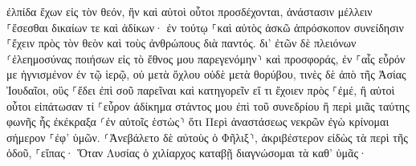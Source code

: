 \documentclass{openreader}
\begin{document}
ἐλπίδα ἔχων εἰς τὸν θεόν, ἣν καὶ αὐτοὶ οὗτοι προσδέχονται, ἀνάστασιν μέλλειν ⸀ἔσεσθαι δικαίων τε καὶ ἀδίκων· 
ἐν τούτῳ ⸀καὶ αὐτὸς ἀσκῶ ἀπρόσκοπον συνείδησιν ⸀ἔχειν πρὸς τὸν θεὸν καὶ τοὺς ἀνθρώπους διὰ παντός. 
δι’ ἐτῶν δὲ πλειόνων ⸂ἐλεημοσύνας ποιήσων εἰς τὸ ἔθνος μου παρεγενόμην⸃ καὶ προσφοράς, 
ἐν ⸀αἷς εὗρόν με ἡγνισμένον ἐν τῷ ἱερῷ, οὐ μετὰ ὄχλου οὐδὲ μετὰ θορύβου, 
τινὲς δὲ ἀπὸ τῆς Ἀσίας Ἰουδαῖοι, οὓς ⸀ἔδει ἐπὶ σοῦ παρεῖναι καὶ κατηγορεῖν εἴ τι ἔχοιεν πρὸς ⸀ἐμέ, 
ἢ αὐτοὶ οὗτοι εἰπάτωσαν τί ⸀εὗρον ἀδίκημα στάντος μου ἐπὶ τοῦ συνεδρίου 
ἢ περὶ μιᾶς ταύτης φωνῆς ἧς ἐκέκραξα ⸂ἐν αὐτοῖς ἑστὼς⸃ ὅτι Περὶ ἀναστάσεως νεκρῶν ἐγὼ κρίνομαι σήμερον ⸀ἐφ’ ὑμῶν. 
⸂Ἀνεβάλετο δὲ αὐτοὺς ὁ Φῆλιξ⸃, ἀκριβέστερον εἰδὼς τὰ περὶ τῆς ὁδοῦ, ⸀εἴπας· Ὅταν Λυσίας ὁ χιλίαρχος καταβῇ διαγνώσομαι τὰ καθ’ ὑμᾶς· 
\end{document}
